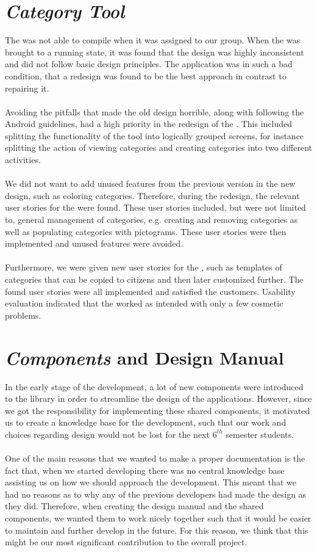 \section*{\emph{Category Tool}}
The \ct was not able to compile when it was assigned to our group. When the \ct was brought to a running state, it was found that the design was highly inconsistent and did not follow basic design principles. The application was in such a bad condition, that a redesign was found to be the best approach in contrast to repairing it.
\\\\
Avoiding the pitfalls that made the old design horrible, along with following the Android guidelines, had a high priority in the redesign of the \ct. This included splitting the functionality of the tool into logically grouped screens, for instance splitting the action of viewing categories and creating categories into two different activities.
\\\\
We did not want to add unused features from the previous version in the new design, such as coloring categories. Therefore, during the redesign, the relevant user stories for the \ct were found. These user stories included, but were not limited to, general management of categories, e.g. creating and removing categories as well as populating categories with pictograms. These user stories were then implemented and unused features were avoided. 
\\\\
Furthermore, we were given new user stories for the \ct, such as templates of categories that can be copied to citizens and then later customized further. The found user stories were all implemented and satisfied the customers. Usability evaluation indicated that the \ct worked as intended with only a few cosmetic problems.

\section*{\giraf \emph{Components} and Design Manual}
In the early stage of the development, a lot of new components were introduced to the \gc library in order to streamline the design of the \giraf applications. However, since we got the responsibility for implementing these shared components, it motivated us to create a knowledge base for the development, such that our work and choices regarding design would not be lost for the next $6^{th}$ semester students. 
\\\\
One of the main reasons that we wanted to make a proper documentation is the fact that, when we started developing there was no central knowledge base assisting us on how we should approach the development. This meant that we had no reasons as to why any of the previous \giraf developers had made the design as they did. Therefore, when creating the design manual and the shared components, we wanted them to work nicely together such that it would be easier to maintain and further develop in the future. For this reason, we think that this might be our most significant contribution to the overall project.